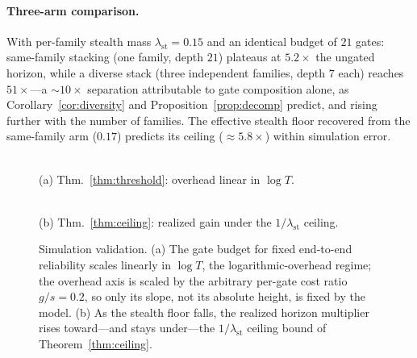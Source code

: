 \documentclass[11pt]{article}
\theoremstyle{remark}
\newcommand{\lst}{\lambda_{\mathrm{st}}}
\begin{document}
\paragraph{Three-arm comparison.} With per-family stealth mass $\lst=0.15$ and an identical budget
of $21$ gates: same-family stacking (one family, depth $21$) plateaus at $5.2\times$ the ungated
horizon, while a diverse stack (three independent families, depth $7$ each) reaches $51\times$---a
$\sim\!10\times$ separation attributable to gate composition alone, as
Corollary~\ref{cor:diversity} and Proposition~\ref{prop:decomp} predict, and rising further with
the number of families.
The effective stealth floor recovered from the same-family arm ($0.17$)
predicts its ceiling ($\approx 5.8\times$) within simulation error.
\begin{figure}[t]
\centering
\begin{minipage}{0.49\textwidth}\centering
{}\\[-2pt]
{\scriptsize (a) Thm.~\ref{thm:threshold}: overhead linear in $\log T$.}
\end{minipage}\hfill
\begin{minipage}{0.49\textwidth}\centering
{}\\[-2pt]
{\scriptsize (b) Thm.~\ref{thm:ceiling}: realized gain under the $1/\lst$ ceiling.}
\end{minipage}
\caption{Simulation validation.
(a) The gate budget for fixed end-to-end reliability scales
linearly in $\log T$, the logarithmic-overhead regime;
the overhead axis is scaled by the
arbitrary per-gate cost ratio $g/s=0.2$, so only its slope, not its absolute height, is fixed
by the model.
(b) As the stealth floor falls, the realized
horizon multiplier rises toward---and stays under---the $1/\lst$ ceiling bound of
Theorem~\ref{thm:ceiling}.}
\label{fig:val}
\end{figure}
\end{document}

